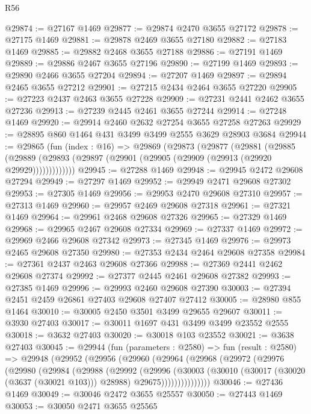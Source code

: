 \begin{lexlean}{R56}
\begin{coremodule}
@29874 := @27167 @1469
@29877 := @29874 @2470 @3655 @27172
@29878 := @27175 @1469
@29881 := @29878 @2469 @3655 @27180
@29882 := @27183 @1469
@29885 := @29882 @2468 @3655 @27188
@29886 := @27191 @1469
@29889 := @29886 @2467 @3655 @27196
@29890 := @27199 @1469
@29893 := @29890 @2466 @3655 @27204
@29894 := @27207 @1469
@29897 := @29894 @2465 @3655 @27212
@29901 := @27215 @2434 @2464 @3655 @27220
@29905 := @27223 @2437 @2463 @3655 @27228
@29909 := @27231 @2441 @2462 @3655 @27236
@29913 := @27239 @2445 @2461 @3655 @27244
@29914 := @27248 @1469
@29920 := @29914 @2460 @2632 @27254 @3655 @27258 @27263
@29929 := @28895 @860 @1464 @431 @3499 @3499 @2555 @3629 @28903 @3684
@29944 := @29865
    (fun (index : @16) =>
    @29869
      (@29873
        (@29877
          (@29881
            (@29885
              (@29889 (@29893 (@29897 (@29901 (@29905 (@29909 (@29913 (@29920 @29929)))))))))))))
@29945 := @27288 @1469
@29948 := @29945 @2472 @29608 @27294
@29949 := @27297 @1469
@29952 := @29949 @2471 @29608 @27302
@29953 := @27305 @1469
@29956 := @29953 @2470 @29608 @27310
@29957 := @27313 @1469
@29960 := @29957 @2469 @29608 @27318
@29961 := @27321 @1469
@29964 := @29961 @2468 @29608 @27326
@29965 := @27329 @1469
@29968 := @29965 @2467 @29608 @27334
@29969 := @27337 @1469
@29972 := @29969 @2466 @29608 @27342
@29973 := @27345 @1469
@29976 := @29973 @2465 @29608 @27350
@29980 := @27353 @2434 @2464 @29608 @27358
@29984 := @27361 @2437 @2463 @29608 @27366
@29988 := @27369 @2441 @2462 @29608 @27374
@29992 := @27377 @2445 @2461 @29608 @27382
@29993 := @27385 @1469
@29996 := @29993 @2460 @29608 @27390
@30003 := @27394 @2451 @2459 @26861 @27403 @29608 @27407 @27412
@30005 := @28980 @855 @1464
@30010 := @30005 @2450 @3501 @3499 @29655 @29607
@30011 := @3930 @27403
@30017 := @30011 @1697 @431 @3499 @3499 @23552 @2555
@30018 := @3632 @27403
@30020 := @30018 @103 @23552
@30021 := @3638 @27403
@30045 := @29944
    (fun (parameters : @2580) =>
    fun (result : @2580) =>
    @29948
      (@29952
        (@29956
          (@29960
            (@29964
              (@29968
                (@29972
                  (@29976
                    (@29980
                      (@29984
                        (@29988
                          (@29992
                            (@29996
                              (@30003
                                (@30010
                                  (@30017 (@30020 (@3637 (@30021 @103))) @28988)
                                  @29675)))))))))))))))
@30046 := @27436 @1469
@30049 := @30046 @2472 @3655 @25557
@30050 := @27443 @1469
@30053 := @30050 @2471 @3655 @25565

\end{coremodule}
\end{lexlean}
